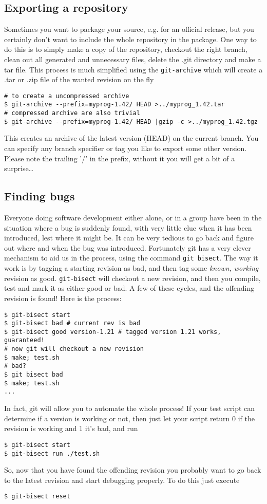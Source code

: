 \documentclass[a4paper,10pt]{article}
\begin{document}
\subsection{Exporting a repository}
Sometimes you want to package your source, e.g. for an official release, but
you certainly don't want to include the whole repository in the package. One
way to do this is to simply make a copy of the repository, checkout the right
branch, clean out all
generated and unnecessary files, delete the .git directory and make a tar
file. This process is much simplified using the \texttt{git-archive} which
will create a .tar or .zip file of the wanted revision on the fly
\begin{verbatim}
# to create a uncompressed archive
$ git-archive --prefix=myprog-1.42/ HEAD >../myprog_1.42.tar
# compressed archive are also trivial
$ git-archive --prefix=myprog-1.42/ HEAD |gzip -c >../myprog_1.42.tgz
\end{verbatim}
This creates an archive of the latest version (HEAD) on the current branch.
You can specify any branch specifier or tag you like to export some other
version.
Please note the trailing '/' in the prefix, without it you will get a bit of a
surprise\ldots

\subsection{Finding bugs}
Everyone doing software development either alone, or in a group have been in
the situation where a bug is suddenly found, with very little clue when
it has been introduced, lest where it might be. It can be very tedious to go
back and figure out where and when the bug was introduced. Fortunately git has
a very clever mechanism to aid us in the process, using the command
\texttt{git bisect}. The way it work is by tagging a starting revision as bad,
and then tag some \textit{known, working} revision as good.
\texttt{git-bisect} will checkout a new revision, and then you compile, test
and mark it as either good or bad. A few of these cycles, and the offending
revision is found! Here is the process:

\begin{verbatim}
$ git-bisect start 
$ git-bisect bad # current rev is bad
$ git-bisect good version-1.21 # tagged version 1.21 works, guaranteed!
# now git will checkout a new revision 
$ make; test.sh 
# bad?
$ git bisect bad
$ make; test.sh
...
\end{verbatim}
In fact, git will allow you to automate the whole process! If your test script
can determine if a version is working or not, then just let your script return
0 if the revision is working and 1 it's bad, and run
\begin{verbatim}
$ git-bisect start 
$ git-bisect run ./test.sh
\end{verbatim}
So, now that you have found the offending revision you probably want to go 
back to the latest revision and start debugging properly. To do this just
execute
\begin{verbatim}
$ git-bisect reset
\end{verbatim}
\end{document}
